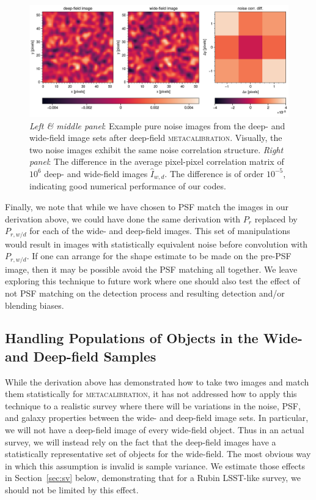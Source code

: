 \documentclass[twocolumn]{openjournal}
\makeatletter
\newcommand{\mcal}{\textsc{metacalibration}\@\xspace}
\makeatother
\begin{document}
\begin{figure}
    \centering
    \includegraphics[width=\linewidth]{noise_corr.png}
    \caption{
      \textit{Left \& middle panel}: Example pure noise images from the deep- and wide-field image
      sets after deep-field \mcal. Visually, the two noise images exhibit the same noise correlation structure.
      \textit{Right panel}: The difference in the average pixel-pixel correlation matrix of $10^6$ deep- and
      wide-field images $\hat I_{w,d}$. The difference is of order $10^{-5}$, indicating good numerical
      performance of our codes.
    } \label{fig:pixel_correlation}
\end{figure}


Finally, we note that while we have chosen to PSF match the images in our derivation
above, we could have done the same derivation with $P_{r}$ replaced by $P_{r,w/d}$ for
each of the wide- and deep-field images. This set of manipulations would result in
images with statistically equivalent noise before convolution with $P_{r,w/d}$. If one
can arrange for the shape estimate to be made on the pre-PSF image, then it may be
possible avoid the PSF matching all together. We leave exploring this technique to
future work where one should also test the effect of not PSF matching on the detection
process and resulting detection and/or blending biases.

\subsection{Handling Populations of Objects in the Wide- and Deep-field Samples}\label{sec:statmatch}

While the derivation above has demonstrated how to take two images and match them
statistically for \mcal, it has not addressed how to apply this technique to a realistic
survey where there will be variations in the noise, PSF, and galaxy properties between
the wide- and deep-field image sets. In particular, we will not have a deep-field image
of every wide-field object. Thus in an actual survey, we will instead rely on the fact
that the deep-field images have a statistically representative set of objects for the
wide-field. The most obvious way in which this assumption is invalid is sample variance.
We estimate those effects in Section~\ref{sec:sv} below, demonstrating that for a Rubin
LSST-like survey, we should not be limited by this effect.
\end{document}

